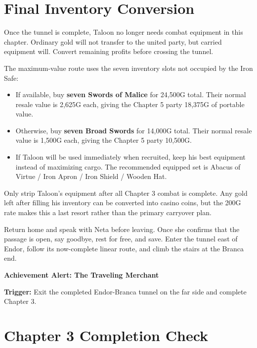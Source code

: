\documentclass[
  american,
  10pt,
  letterpaper,
  oneside,
  open=any]{scrreprt}
\providecommand{\tightlist}{%
  \setlength{\itemsep}{0pt}\setlength{\parskip}{0pt}}
\begin{document}
\section{Final Inventory Conversion}\label{final-inventory-conversion}

Once the tunnel is complete, Taloon no longer needs combat equipment in
this chapter. Ordinary gold will not transfer to the united party, but
carried equipment will. Convert remaining profits before crossing the
tunnel.

The maximum-value route uses the seven inventory slots not occupied by
the Iron Safe:

\begin{itemize}
\tightlist
\item
  If available, buy \textbf{seven Swords of Malice} for 24,500G total.
  Their normal resale value is 2,625G each, giving the Chapter 5 party
  18,375G of portable value.
\item
  Otherwise, buy \textbf{seven Broad Swords} for 14,000G total. Their
  normal resale value is 1,500G each, giving the Chapter 5 party
  10,500G.
\item
  If Taloon will be used immediately when recruited, keep his best
  equipment instead of maximizing cargo. The recommended equipped set is
  Abacus of Virtue / Iron Apron / Iron Shield / Wooden Hat.
\end{itemize}

Only strip Taloon's equipment after all Chapter 3 combat is complete.
Any gold left after filling his inventory can be converted into casino
coins, but the 200G rate makes this a last resort rather than the
primary carryover plan.

Return home and speak with Neta before leaving. Once she confirms that
the passage is open, say goodbye, rest for free, and save. Enter the
tunnel east of Endor, follow its now-complete linear route, and climb
the stairs at the Branca end.

\begin{achievementalert}

\textbf{Achievement Alert: The Traveling Merchant}

\textbf{Trigger:} Exit the completed Endor-Branca tunnel on the far side
and complete Chapter 3.

\end{achievementalert}

\section{Chapter 3 Completion Check}\label{chapter-3-completion-check}
\end{document}
